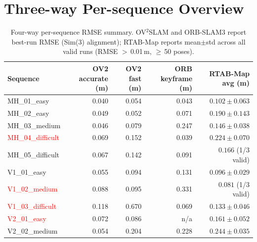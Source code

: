 \documentclass[11pt]{article}
\begin{document}
\clearpage

\section{Three-way Per-sequence Overview}

\begin{table}[H]
\centering
\small
\caption{Four-way per-sequence RMSE summary. OV$^2$SLAM and ORB-SLAM3 report best-run RMSE (Sim(3) alignment); RTAB-Map reports mean$\pm$std across all valid runs (RMSE $>$\,0.01\,m, $\geq$\,50 poses).}
\label{tab:three_way_summary_rmse}
\begin{tabular}{lrrrr}
\toprule
Sequence & OV2 accurate (m) & OV2 fast (m) & ORB keyframe (m) & RTAB-Map avg (m) \\
\midrule
MH\_01\_easy & 0.040 & 0.054 & 0.043 & $0.102 \pm 0.063$ \\
MH\_02\_easy & 0.049 & 0.052 & 0.071 & $0.190 \pm 0.143$ \\
MH\_03\_medium & 0.046 & 0.079 & 0.247 & $0.146 \pm 0.038$ \\
\textcolor{red}{MH\_04\_difficult} & 0.069 & 0.152 & 0.039 & $0.224 \pm 0.070$ \\
MH\_05\_difficult & 0.067 & 0.142 & 0.091 & $0.166$ (1/3 valid) \\
V1\_01\_easy & 0.055 & 0.094 & 0.131 & $0.096 \pm 0.029$ \\
\textcolor{red}{V1\_02\_medium} & 0.088 & 0.095 & 0.331 & $0.081$ (1/3 valid) \\
\textcolor{red}{V1\_03\_difficult} & 0.118 & 0.670 & 0.069 & $0.133 \pm 0.046$ \\
\textcolor{red}{V2\_01\_easy} & 0.072 & 0.086 & n/a & $0.161 \pm 0.052$ \\
V2\_02\_medium & 0.054 & 0.204 & 0.228 & $0.244 \pm 0.035$ \\
\bottomrule
\end{tabular}
\end{table}
\end{document}
